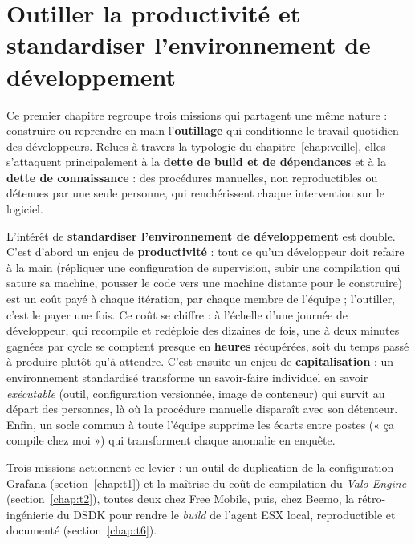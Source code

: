 \chapter{Outiller la productivité et standardiser l'environnement de développement}
\label{chap:outils}

Ce premier chapitre regroupe trois missions qui partagent une même nature :
construire ou reprendre en main l'\textbf{outillage} qui conditionne le
travail quotidien des développeurs. Relues à travers la typologie du
chapitre~\ref{chap:veille}, elles s'attaquent principalement à la
\textbf{dette de build et de dépendances} et à la \textbf{dette de
connaissance} : des procédures manuelles, non reproductibles ou détenues par
une seule personne, qui renchérissent chaque intervention sur le logiciel.

L'intérêt de \textbf{standardiser l'environnement de développement} est
double. C'est d'abord un enjeu de \textbf{productivité} : tout ce qu'un
développeur doit refaire à la main (répliquer une configuration de
supervision, subir une compilation qui sature sa machine, pousser le code
vers une machine distante pour le construire) est un coût payé à chaque
itération, par chaque membre de l'équipe ; l'outiller, c'est le payer une
fois. Ce coût se chiffre : à l'échelle d'une journée de développeur, qui
recompile et redéploie des dizaines de fois, une à deux minutes gagnées par
cycle se comptent presque en \textbf{heures} récupérées, soit du temps passé à
produire plutôt qu'à attendre. C'est ensuite un enjeu de \textbf{capitalisation} : un environnement
standardisé transforme un savoir-faire individuel en savoir
\emph{exécutable} (outil, configuration versionnée, image de conteneur) qui
survit au départ des personnes, là où la procédure manuelle disparaît avec
son détenteur. Enfin, un socle commun à toute l'équipe supprime les écarts
entre postes (« ça compile chez moi ») qui transforment chaque anomalie en
enquête.

Trois missions actionnent ce levier : un outil de duplication de la
configuration Grafana (section~\ref{chap:t1}) et la maîtrise du coût de
compilation du \emph{Valo Engine} (section~\ref{chap:t2}), toutes deux chez
Free Mobile, puis, chez Beemo, la rétro-ingénierie du DSDK pour rendre le
\emph{build} de l'agent ESX local, reproductible et documenté
(section~\ref{chap:t6}).
